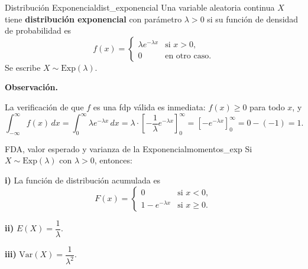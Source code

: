 \documentclass[12pt, a4paper]{book}
\newenvironment{observacion}{%
    \par\medskip\noindent\textbf{\color{azul}Observaci\'{o}n.}\enspace\itshape
}{\par\medskip}
\numberwithin{equation}{chapter}
\begin{document}
\begin{definicion}{Distribuci\'{o}n Exponencial}{dist_exponencial}
	Una variable aleatoria continua $X$ tiene
	\textbf{distribución exponencial} con parámetro $\lambda > 0$
	si su función de densidad de probabilidad es
	\[
	f(x) = \begin{cases}
		\lambda e^{-\lambda x} & \text{si } x > 0, \\
		0                      & \text{en otro caso.}
	\end{cases}
	\]
	Se escribe $X \sim \mathrm{Exp}(\lambda)$.
\end{definicion}

\begin{observacion}
	La verificación de que $f$ es una fdp válida es inmediata:
	$f(x) \geq 0$ para todo $x$, y
	\[
	\int_{-\infty}^{\infty} f(x)\,dx
	= \int_0^{\infty} \lambda e^{-\lambda x}\,dx
	= \lambda \cdot \left[-\frac{1}{\lambda}e^{-\lambda x}
	\right]_0^{\infty}
	= \left[-e^{-\lambda x}\right]_0^{\infty}
	= 0 - (-1) = 1.
	\]
\end{observacion}

\begin{proposicion}{FDA, valor esperado y varianza de la
		Exponencial}{momentos_exp}
	Si $X \sim \mathrm{Exp}(\lambda)$ con $\lambda > 0$, entonces:
	
	\medskip
	\noindent\textbf{i)} La función de distribución acumulada es
	\[
	F(x) = \begin{cases}
		0                    & \text{si } x < 0,    \\[4pt]
		1 - e^{-\lambda x}   & \text{si } x \geq 0.
	\end{cases}
	\]
	
	\medskip
	\noindent\textbf{ii)} $E(X) = \dfrac{1}{\lambda}$.
	
	\medskip
	\noindent\textbf{iii)} $\mathrm{Var}(X) = \dfrac{1}{\lambda^2}$.
\end{proposicion}
\end{document}

